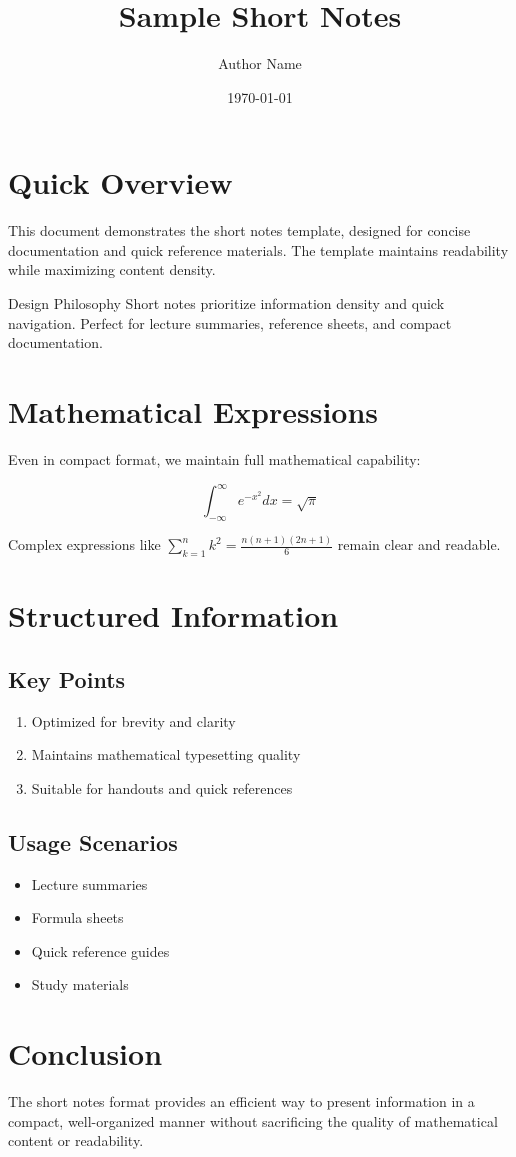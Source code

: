 \documentclass{e_class_noteShort}
\title{Sample Short Notes}
\author{Author Name}
\date{\today}
\begin{document}
\maketitle
\mytoc

\section{Quick Overview}

This document demonstrates the short notes template, designed for concise documentation and quick reference materials. The template maintains readability while maximizing content density.

\begin{callout}{Design Philosophy}
    Short notes prioritize information density and quick navigation. Perfect for lecture summaries, reference sheets, and compact documentation.
\end{callout}

\section{Mathematical Expressions}

Even in compact format, we maintain full mathematical capability:

$$\int_{-\infty}^{\infty} e^{-x^2} dx = \sqrt{\pi}$$

Complex expressions like $\sum_{k=1}^{n} k^2 = \frac{n(n+1)(2n+1)}{6}$ remain clear and readable.

\section{Structured Information}

\subsection{Key Points}
\begin{enumerate}
    \item Optimized for brevity and clarity
    \item Maintains mathematical typesetting quality
    \item Suitable for handouts and quick references
\end{enumerate}

\subsection{Usage Scenarios}
\begin{itemize}
    \item Lecture summaries
    \item Formula sheets
    \item Quick reference guides
    \item Study materials
\end{itemize}

\section{Conclusion}

The short notes format provides an efficient way to present information in a compact, well-organized manner without sacrificing the quality of mathematical content or readability.
\end{document}
